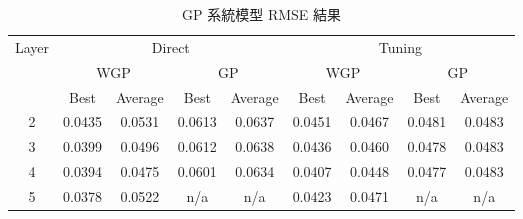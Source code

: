 {\renewcommand{\arraystretch}{1.5}
\begin{table}[hbtp]
  \begin{center}
    \caption{GP 系統模型 RMSE 結果}
    \label{tab:gp-result}
    \begin{tabular}{c c c c c c c c c}
      \hline
      \multirow{3}{*}{Layer} & \multicolumn{4}{c}{Direct} & \multicolumn{4}{c}{Tuning} \\
       & \multicolumn{2}{c}{WGP} & \multicolumn{2}{c}{GP} & \multicolumn{2}{c}{WGP} & \multicolumn{2}{c}{GP} \\
       & Best & Average & Best & Average & Best & Average & Best & Average \\
      \hline
      2 & 0.0435 & 0.0531 & 0.0613 & 0.0637 & 0.0451 & 0.0467 & 0.0481 & 0.0483 \\
      3 & 0.0399 & 0.0496 & 0.0612 & 0.0638 & 0.0436 & 0.0460 & 0.0478 & 0.0483 \\
      4 & 0.0394 & 0.0475 & 0.0601 & 0.0634 & 0.0407 & 0.0448 & 0.0477 & 0.0483 \\
      5 & 0.0378 & 0.0522 &     n/a   &    n/a    & 0.0423 & 0.0471 &    n/a    &    n/a    \\
      \hline
      \end{tabular}
  \end{center}
\end{table}
}

